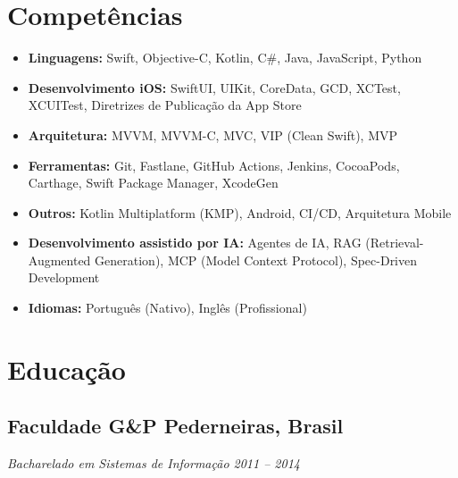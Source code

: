 \documentclass[a4paper,10pt]{article}
\begin{document}

\section{Competências}

\begin{itemize}

\item \textbf{Linguagens:} Swift, Objective-C, Kotlin, C\#, Java, JavaScript, Python

\item \textbf{Desenvolvimento iOS:} SwiftUI, UIKit, CoreData, GCD, XCTest, XCUITest, Diretrizes de Publicação da App Store

\item \textbf{Arquitetura:} MVVM, MVVM-C, MVC, VIP (Clean Swift), MVP

\item \textbf{Ferramentas:} Git, Fastlane, GitHub Actions, Jenkins, CocoaPods, Carthage, Swift Package Manager, XcodeGen

\item \textbf{Outros:} Kotlin Multiplatform (KMP), Android, CI/CD, Arquitetura Mobile

\item \textbf{Desenvolvimento assistido por IA:} Agentes de IA, RAG (Retrieval-Augmented Generation), MCP (Model Context Protocol), Spec-Driven Development

\item \textbf{Idiomas:} Português (Nativo), Inglês (Profissional)

\end{itemize}


\section{Educação}

\subsection*{\textbf{Faculdade G\&P} \hfill Pederneiras, Brasil}
\textit{Bacharelado em Sistemas de Informação \hfill 2011 – 2014}
\end{document}
